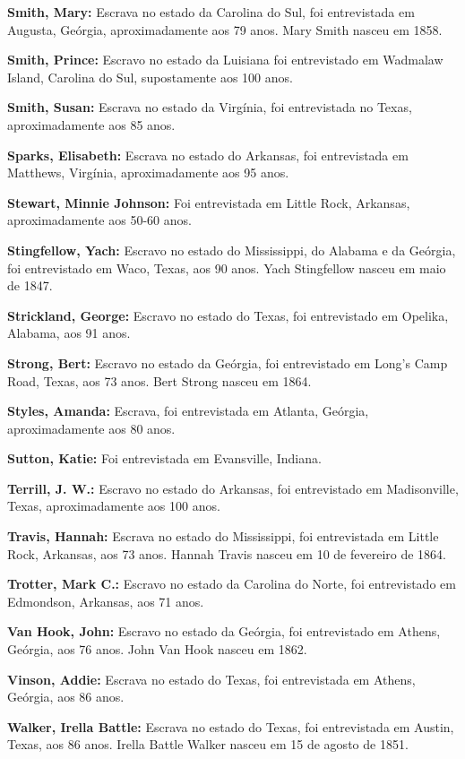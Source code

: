 \textbf{Smith, Mary:} Escrava no estado da Carolina do Sul, foi
entrevistada em Augusta, Geórgia, aproximadamente aos 79 anos. Mary
Smith nasceu em 1858.

\textbf{Smith, Prince:} Escravo no estado da Luisiana foi entrevistado
em Wadmalaw Island, Carolina do Sul, supostamente aos 100 anos.

\textbf{Smith, Susan:} Escrava no estado da Virgínia, foi entrevistada
no Texas, aproximadamente aos 85 anos.

\textbf{Sparks, Elisabeth:} Escrava no estado do Arkansas, foi
entrevistada em Matthews, Virgínia, aproximadamente aos 95 anos.

\textbf{Stewart, Minnie Johnson:} Foi entrevistada em Little Rock,
Arkansas, aproximadamente aos 50-60 anos.

\textbf{Stingfellow, Yach:} Escravo no estado do Mississippi, do Alabama
e da Geórgia, foi entrevistado em Waco, Texas, aos 90 anos. Yach
Stingfellow nasceu em maio de 1847.

\textbf{Strickland, George:} Escravo no estado do Texas, foi
entrevistado em Opelika, Alabama, aos 91 anos.

\textbf{Strong, Bert:} Escravo no estado da Geórgia, foi entrevistado em
Long's Camp Road, Texas, aos 73 anos. Bert Strong nasceu em 1864.

\textbf{Styles, Amanda:} Escrava, foi entrevistada em Atlanta, Geórgia,
aproximadamente aos 80 anos.

\textbf{Sutton, Katie:} Foi entrevistada em Evansville, Indiana.

\textbf{Terrill, J. W.:} Escravo no estado do Arkansas, foi entrevistado
em Madisonville, Texas, aproximadamente aos 100 anos.

\textbf{Travis, Hannah:} Escrava no estado do Mississippi, foi
entrevistada em Little Rock, Arkansas, aos 73 anos. Hannah Travis nasceu
em 10 de fevereiro de 1864.

\textbf{Trotter, Mark C.:} Escravo no estado da Carolina do Norte, foi
entrevistado em Edmondson, Arkansas, aos 71 anos.

\textbf{Van Hook, John:} Escravo no estado da Geórgia, foi entrevistado
em Athens, Geórgia, aos 76 anos. John Van Hook nasceu em 1862.

\textbf{Vinson, Addie:} Escrava no estado do Texas, foi entrevistada em
Athens, Geórgia, aos 86 anos.

\textbf{Walker, Irella Battle:} Escrava no estado do Texas, foi
entrevistada em Austin, Texas, aos 86 anos. Irella Battle Walker nasceu
em 15 de agosto de 1851.

